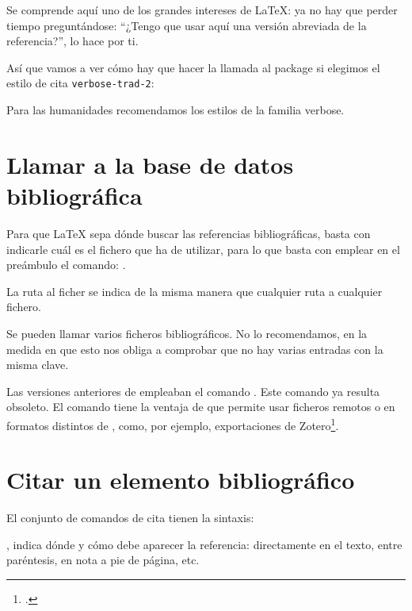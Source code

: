 Se comprende aquí uno de los grandes intereses de \LaTeX{}: ya no hay
que perder tiempo preguntándose: \enquote{¿Tengo que usar aquí una
  versión abreviada de la referencia?},  lo hace por
ti.

Así que vamos a ver cómo hay que hacer la llamada al package si
elegimos el estilo de cita \verb|verbose-trad-2|:

\begin{latexcode}
\usepackage[citestyle=verbose-trad2]{biblatex}
\end{latexcode}

Para las humanidades recomendamos los estilos de la familia verbose.


\section{Llamar a la base de datos bibliográfica}


Para que \LaTeX{} sepa dónde buscar las referencias bibliográficas,
basta con indicarle cuál es el fichero  que ha de utilizar,
para lo que basta con emplear en el preámbulo el comando:
.

La ruta al ficher se indica de la misma manera que cualquier ruta a
cualquier fichero.

\begin{attention}
Se pueden llamar varios ficheros bibliográficos. No lo recomendamos,
en la medida en que esto nos obliga a comprobar que no hay varias
entradas con la misma clave.
\end{attention}

\begin{plusloins}
Las versiones anteriores de  empleaban el comando
. Este comando ya resulta obsoleto. El comando
 tiene la ventaja de que permite usar ficheros
remotos o en formatos distintos de , como, por ejemplo,
exportaciones de Zotero\footcite{biblatex_resources}. 
\end{plusloins}

\section{Citar un elemento bibliográfico}

El conjunto de comandos de cita tienen la sintaxis: 

,
 indica dónde y cómo debe aparecer la referencia:
directamente en el texto, entre paréntesis, en nota a pie de página, etc.

